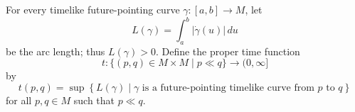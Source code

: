 For every timelike future-pointing curve $\gamma: [a, b] \rightarrow M$, let
$$L(\gamma) = \int_{a}^{b} |\dot{\gamma}(u)| \, du$$
be the arc length; thus $L(\gamma) > 0$. Define the proper time function
$$t: \{(p, q) \in M \times M \mid p \ll q\} \rightarrow (0, \infty]$$
by
$$t(p, q) = \sup \left\{ L(\gamma) \mid \gamma \text{ is a future-pointing timelike curve from } p \text{ to } q \right\}$$
for all $p, q \in M$ such that $p \ll q$.
